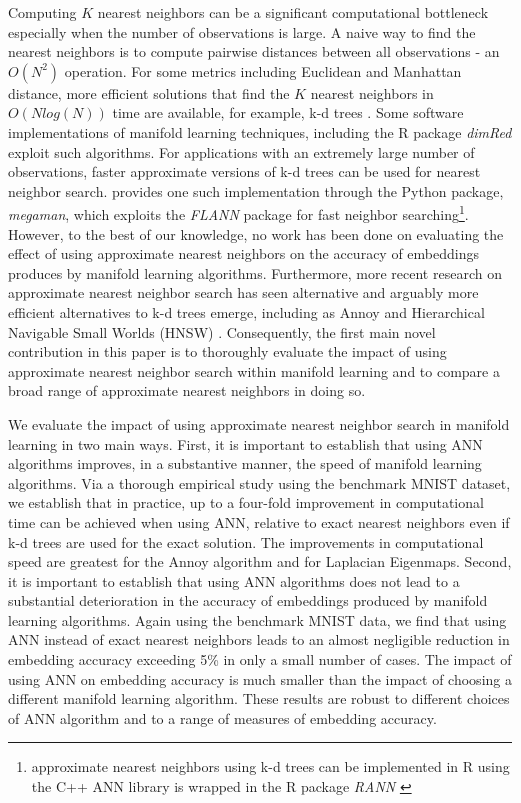 \documentclass[11pt,a4paper,]{article}
\begin{document}
Computing \(K\) nearest neighbors can be a significant computational bottleneck especially when the number of observations is large. A naive way to find the nearest neighbors is to compute pairwise distances between all observations - an \(O(N^2)\) operation. For some metrics including Euclidean and Manhattan distance, more efficient solutions that find the \(K\) nearest neighbors in \(O(Nlog(N))\) time are available, for example, k-d trees \autocite{Bentley1975-zo}. Some software implementations of manifold learning techniques, including the R package \emph{dimRed} \autocite{Kraemer2018-zf} exploit such algorithms. For applications with an extremely large number of observations, faster approximate versions of k-d trees can be used for nearest neighbor search. \textcite{McQueen2016-xz} provides one such implementation through the Python package, \emph{megaman}, which exploits the \emph{FLANN} \autocite{Muja2009-de} package for fast neighbor searching\footnote{approximate nearest neighbors using k-d trees can be implemented in R using the C++ ANN library \autocite{mount2010-ann} is wrapped in the R package \emph{RANN} \autocite{jefferislab2019-l2}}. However, to the best of our knowledge, no work has been done on evaluating the effect of using approximate nearest neighbors on the accuracy of embeddings produces by manifold learning algorithms. Furthermore, more recent research on approximate nearest neighbor search has seen alternative and arguably more efficient alternatives to k-d trees emerge, including as Annoy \autocite{Bernhardsson2016-tf} and Hierarchical Navigable Small Worlds (HNSW) \autocite{Malkov2020-jp}. Consequently, the first main novel contribution in this paper is to thoroughly evaluate the impact of using approximate nearest neighbor search within manifold learning and to compare a broad range of approximate nearest neighbors in doing so.

We evaluate the impact of using approximate nearest neighbor search in manifold learning in two main ways. First, it is important to establish that using ANN algorithms improves, in a substantive manner, the speed of manifold learning algorithms. Via a thorough empirical study using the benchmark MNIST dataset, we establish that in practice, up to a four-fold improvement in computational time can be achieved when using ANN, relative to exact nearest neighbors even if k-d trees are used for the exact solution. The improvements in computational speed are greatest for the Annoy algorithm and for Laplacian Eigenmaps. Second, it is important to establish that using ANN algorithms does not lead to a substantial deterioration in the accuracy of embeddings produced by manifold learning algorithms. Again using the benchmark MNIST data, we find that using ANN instead of exact nearest neighbors leads to an almost negligible reduction in embedding accuracy exceeding 5\% in only a small number of cases. The impact of using ANN on embedding accuracy is much smaller than the impact of choosing a different manifold learning algorithm. These results are robust to different choices of ANN algorithm and to a range of measures of embedding accuracy.
\end{document}

